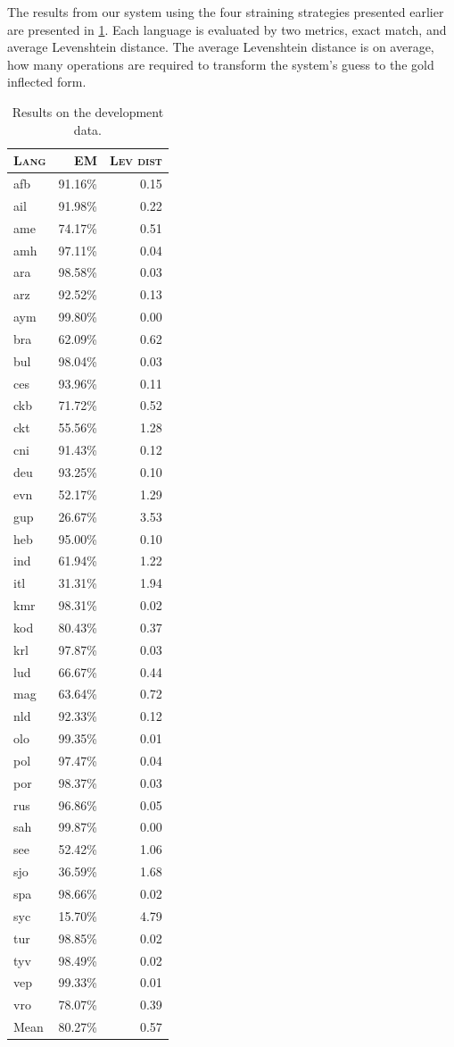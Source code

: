 \documentclass[11pt,a4paper]{article}
\begin{document}
The results from our system using the four straining strategies
presented earlier are presented in \cref{tab:accuracy-dev}. Each
language is evaluated by two metrics, exact match, and average
Levenshtein distance. The average Levenshtein distance is on average,
how many operations are required to transform the system's guess to
the gold inflected form.
%
\begin{table}[ht!]
\centering
\begin{tabular}{lrr}
\textsc{Lang} & \textsc{EM} & \textsc{Lev dist}  \\
  \hline
  afb & 91.16\% & 0.15 \\
  ail & 91.98\% & 0.22 \\
  ame & 74.17\% & 0.51 \\
  amh & 97.11\% & 0.04 \\
  ara & 98.58\% & 0.03 \\
  arz & 92.52\% & 0.13 \\
  aym & 99.80\% & 0.00 \\
  bra & 62.09\% & 0.62 \\
  bul & 98.04\% & 0.03 \\
  ces & 93.96\% & 0.11 \\
  ckb & 71.72\% & 0.52 \\
  ckt & 55.56\% & 1.28 \\
  cni & 91.43\% & 0.12 \\
  deu & 93.25\% & 0.10 \\
  evn & 52.17\% & 1.29 \\
  gup & 26.67\% & 3.53 \\
  heb & 95.00\% & 0.10 \\
  ind & 61.94\% & 1.22 \\
  itl & 31.31\% & 1.94 \\
  kmr & 98.31\% & 0.02 \\
  kod & 80.43\% & 0.37 \\
  krl & 97.87\% & 0.03 \\
  lud & 66.67\% & 0.44 \\
  mag & 63.64\% & 0.72 \\
  nld & 92.33\% & 0.12 \\
  olo & 99.35\% & 0.01 \\
  pol & 97.47\% & 0.04 \\
  por & 98.37\% & 0.03 \\
  rus & 96.86\% & 0.05 \\
  sah & 99.87\% & 0.00 \\
  see & 52.42\% & 1.06 \\
  sjo & 36.59\% & 1.68 \\
  spa & 98.66\% & 0.02 \\
  syc & 15.70\% & 4.79 \\
  tur & 98.85\% & 0.02 \\
  tyv & 98.49\% & 0.02 \\
  vep & 99.33\% & 0.01 \\
  vro & 78.07\% & 0.39 \\
  \hline
  Mean & 80.27\% & 0.57
\end{tabular} 
\caption{Results on the development data.}
\label{tab:accuracy-dev}
\end{table}
\end{document}
